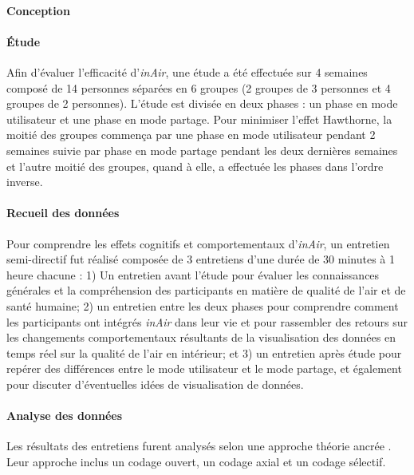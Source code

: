 \documentclass[10pt,a5paper,twoside]{article}
\begin{document}
\paragraph{Conception}\label{conception-2}

\paragraph{Étude}\label{uxe9tude-2}

Afin d'évaluer l'efficacité d'\emph{inAir}, une étude a été effectuée
sur 4 semaines composé de 14 personnes séparées en 6 groupes (2 groupes
de 3 personnes et 4 groupes de 2 personnes). L'étude est divisée en deux
phases : un phase en mode utilisateur et une phase en mode partage. Pour
minimiser l'effet Hawthorne, la moitié des groupes commença par une
phase en mode utilisateur pendant 2 semaines suivie par phase en mode
partage pendant les deux dernières semaines et l'autre moitié des
groupes, quand à elle, a effectuée les phases dans l'ordre inverse.

\paragraph{Recueil des données}\label{recueil-des-donnuxe9es-1}

Pour comprendre les effets cognitifs et comportementaux d'\emph{inAir},
un entretien semi-directif fut réalisé composée de 3 entretiens d'une
durée de 30 minutes à 1 heure chacune : 1) Un entretien avant l'étude
pour évaluer les connaissances générales et la compréhension des
participants en matière de qualité de l'air et de santé humaine; 2) un
entretien entre les deux phases pour comprendre comment les participants
ont intégrés \emph{inAir} dans leur vie et pour rassembler des retours
sur les changements comportementaux résultants de la visualisation des
données en temps réel sur la qualité de l'air en intérieur; et 3) un
entretien après étude pour repérer des différences entre le mode
utilisateur et le mode partage, et également pour discuter d'éventuelles
idées de visualisation de données.

\paragraph{Analyse des données}\label{analyse-des-donnuxe9es}

Les résultats des entretiens furent analysés selon une approche théorie
ancrée \citep{strauss1990basics}. Leur approche inclus un codage ouvert,
un codage axial et un codage sélectif.
\end{document}
